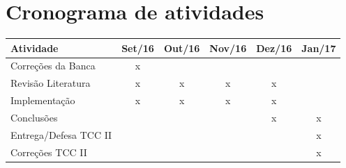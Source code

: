 \section{Cronograma de atividades}

\begin{table}[!hb]
  \centering
  \begin{tabular}{|l|c|c|c|c|c|}
  \hline
  Atividade & Set/16 & Out/16 & Nov/16 & Dez/16 & Jan/17\tabularnewline
  \hline
  Correções da Banca & x &  &  &  & \tabularnewline
  \hline
  Revisão Literatura & x & x & x & x & \tabularnewline
  \hline
  Implementação & x & x & x & x & \tabularnewline
  \hline
  Conclusões &  &  &  & x & x\tabularnewline
  \hline
  Entrega/Defesa TCC II &  &  &  &  & x\tabularnewline
  \hline
  Correções TCC II &  &  &  &  & x\tabularnewline
  \hline
  \end{tabular}
\end{table}
